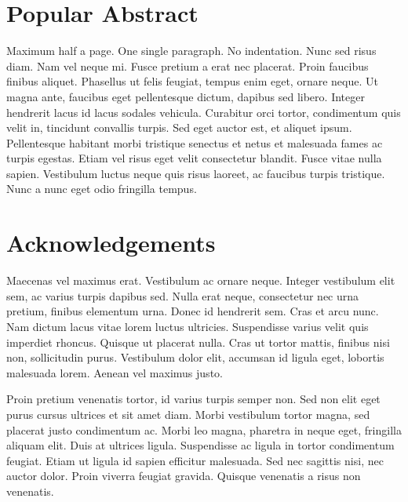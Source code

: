 \documentclass[a4paper,12pt,stu,donotrepeattitle,floatsintext,twoside]{apa7}
\begin{document}


\section*{Popular Abstract}

\noindent Maximum half a page. One single paragraph. No indentation. Nunc sed risus diam. Nam vel neque mi. Fusce pretium a erat nec placerat. Proin faucibus finibus aliquet. Phasellus ut felis feugiat, tempus enim eget, ornare neque. Ut magna ante, faucibus eget pellentesque dictum, dapibus sed libero. Integer hendrerit lacus id lacus sodales vehicula. Curabitur orci tortor, condimentum quis velit in, tincidunt convallis turpis. Sed eget auctor est, et aliquet ipsum. Pellentesque habitant morbi tristique senectus et netus et malesuada fames ac turpis egestas. Etiam vel risus eget velit consectetur blandit. Fusce vitae nulla sapien. Vestibulum luctus neque quis risus laoreet, ac faucibus turpis tristique. Nunc a nunc eget odio fringilla tempus.

\newpage

\section*{Acknowledgements}

Maecenas vel maximus erat. Vestibulum ac ornare neque. Integer vestibulum elit sem, ac varius turpis dapibus sed. Nulla erat neque, consectetur nec urna pretium, finibus elementum urna. Donec id hendrerit sem. Cras et arcu nunc. Nam dictum lacus vitae lorem luctus ultricies. Suspendisse varius velit quis imperdiet rhoncus. Quisque ut placerat nulla. Cras ut tortor mattis, finibus nisi non, sollicitudin purus. Vestibulum dolor elit, accumsan id ligula eget, lobortis malesuada lorem. Aenean vel maximus justo.

Proin pretium venenatis tortor, id varius turpis semper non. Sed non elit eget purus cursus ultrices et sit amet diam. Morbi vestibulum tortor magna, sed placerat justo condimentum ac. Morbi leo magna, pharetra in neque eget, fringilla aliquam elit. Duis at ultrices ligula. Suspendisse ac ligula in tortor condimentum feugiat. Etiam ut ligula id sapien efficitur malesuada. Sed nec sagittis nisi, nec auctor dolor. Proin viverra feugiat gravida. Quisque venenatis a risus non venenatis.
\end{document}
